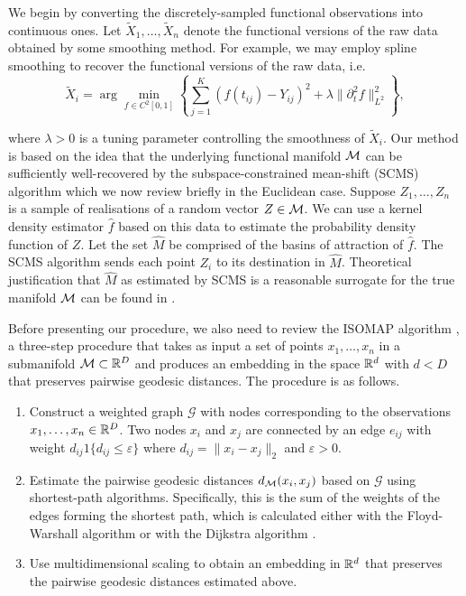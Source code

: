 We begin by converting the discretely-sampled functional observations
into continuous ones. Let \(\tilde X_1,\ldots,\tilde X_n\) denote the
functional versions of the raw data obtained by some smoothing method.
For example, we may employ spline smoothing \cite{Ramsay2005} to recover
the functional versions of the raw data, i.e.\\

\begin{equation}\label{eq_spline_smoothing} 
\tilde X_i = \arg \min_{f\in C^2[0,1]}\left\{\sum_{j=1}^{K}\left(f(t_{ij})-Y_{ij}\right)^2+\lambda \|\partial^2_tf\|^2_{L^2}\right\},
\end{equation}

where \(\lambda>0\) is a tuning parameter controlling the smoothness of
\(\tilde X_i\). Our method is based on the idea that the underlying
functional manifold \(\mathcal{M}\) can be sufficiently well-recovered by the
subspace-constrained mean-shift (SCMS) algorithm \cite{Ozertem2011}
which we now review briefly in the Euclidean case. Suppose
\(Z_1,\ldots,Z_n\) is a sample of realisations of a random vector
\(Z \in \mathcal{M}\). We can use a kernel density estimator \(\hat f\) based on
this data to estimate the probability density function of \(Z\). Let the
set \(\hat M\) be comprised of the basins of attraction of \(\hat f\).
The SCMS algorithm sends each point \(Z_i\) to its destination in
\(\hat M\). Theoretical justification that \(\hat M\) as estimated by
SCMS is a reasonable surrogate for the true manifold \(\mathcal{M}\) can be found
in \cite{Genovese2014}.

Before presenting our procedure, we also need to review the ISOMAP
algorithm \cite{Tenenbaum2000}, a three-step procedure that takes as
input a set of points \(x_1,\ldots,x_n\) in a submanifold
\(\mathcal{M} \subset \mathbb{R}^D\) and produces an embedding in the space \(\mathbb{R}^d\) with
\(d<D\) that preserves pairwise geodesic distances. The procedure is as
follows.

\begin{enumerate}
\def\labelenumi{\arabic{enumi}.}
\tightlist
\item
  Construct a weighted graph \(\mathcal{G}\) with nodes corresponding to
  the observations \(x_1,\ldots,x_n\in \mathbb{R}^D\). Two nodes \(x_i\) and
  \(x_j\) are connected by an edge \(e_{ij}\) with weight
  \(d_{ij} 1\{d_{ij} \le \varepsilon \}\) where
  \(d_{ij}=\|x_i-x_j \|_{2}\) and \(\varepsilon > 0\).
\item
  Estimate the pairwise geodesic distances \(d_{\mathcal{M}}(x_i,x_j)\) based on
  \(\mathcal{G}\) using shortest-path algorithms. Specifically, this is
  the sum of the weights of the edges forming the shortest path, which
  is calculated either with the Floyd-Warshall algorithm
  \cite{Floyd1962} or with the Dijkstra algorithm
  \cite{Dijkstra59anote}.
\item
  Use multidimensional scaling to obtain an embedding in \(\mathbb{R}^d\) that
  preserves the pairwise geodesic distances estimated above.
\end{enumerate}

